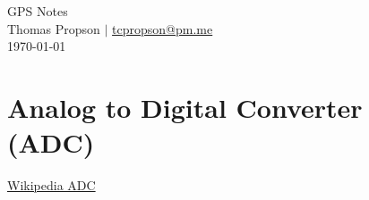 \documentclass[12pt]{article}
\begin{document}
\begin{center}
  {\huge GPS Notes} \\[0.5em]
  {\large Thomas Propson $\vert$ \href{mailto:tcpropson@pm.me}{tcpropson@pm.me} \\[0.5em]
    \today}
\end{center}

\section{Analog to Digital Converter (ADC)}
\href{https://en.wikipedia.org/wiki/Analog-to-digital_converter}{Wikipedia ADC}
\end{document}
